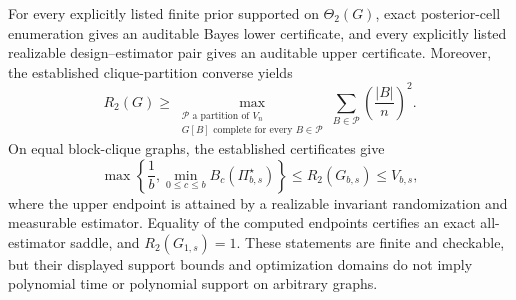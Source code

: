 For every explicitly listed finite prior supported on \(\Theta_2(G)\), exact posterior-cell enumeration gives an auditable Bayes lower certificate, and every explicitly listed realizable design--estimator pair gives an auditable upper certificate. Moreover, the established clique-partition converse yields \[R_2(G)\geq\max_{\substack{\mathcal P\text{ a partition of }V_n\\G[B]\text{ complete for every }B\in\mathcal P}}\sum_{B\in\mathcal P}\left(\frac{|B|}{n}\right)^2.\] On equal block-clique graphs, the established certificates give \[\max\left\{\frac1b,\min_{0\leq c\leq b}B_c(\Pi_{b,s}^{\star})\right\}\leq R_2(G_{b,s})\leq V_{b,s},\] where the upper endpoint is attained by a realizable invariant randomization and measurable estimator. Equality of the computed endpoints certifies an exact all-estimator saddle, and \(R_2(G_{1,s})=1\). These statements are finite and checkable, but their displayed support bounds and optimization domains do not imply polynomial time or polynomial support on arbitrary graphs.